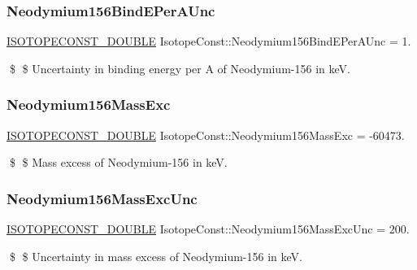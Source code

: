 \subsubsection{\texorpdfstring{Neodymium156\+Bind\+E\+Per\+A\+Unc}{Neodymium156BindEPerAUnc}}
{\footnotesize\ttfamily \mbox{\hyperlink{group___isotope_const-_macros_ga8f45a7272ce02c0b4c65c44636ed719a}{I\+S\+O\+T\+O\+P\+E\+C\+O\+N\+S\+T\+\_\+\+D\+O\+U\+B\+LE}} Isotope\+Const\+::\+Neodymium156\+Bind\+E\+Per\+A\+Unc = 1.}

\$ \$ Uncertainty in binding energy per A of Neodymium-\/156 in keV. \mbox{\label{group___isotope_const-_neodymium-_nd156_ga262cb58e1ba4e6573d21969db9212f2f}} 
\subsubsection{\texorpdfstring{Neodymium156\+Mass\+Exc}{Neodymium156MassExc}}
{\footnotesize\ttfamily \mbox{\hyperlink{group___isotope_const-_macros_ga8f45a7272ce02c0b4c65c44636ed719a}{I\+S\+O\+T\+O\+P\+E\+C\+O\+N\+S\+T\+\_\+\+D\+O\+U\+B\+LE}} Isotope\+Const\+::\+Neodymium156\+Mass\+Exc = -\/60473.}

\$ \$ Mass excess of Neodymium-\/156 in keV. \mbox{\label{group___isotope_const-_neodymium-_nd156_gaec2de5279ee342267ba7674ed91ed8c7}} 
\subsubsection{\texorpdfstring{Neodymium156\+Mass\+Exc\+Unc}{Neodymium156MassExcUnc}}
{\footnotesize\ttfamily \mbox{\hyperlink{group___isotope_const-_macros_ga8f45a7272ce02c0b4c65c44636ed719a}{I\+S\+O\+T\+O\+P\+E\+C\+O\+N\+S\+T\+\_\+\+D\+O\+U\+B\+LE}} Isotope\+Const\+::\+Neodymium156\+Mass\+Exc\+Unc = 200.}

\$ \$ Uncertainty in mass excess of Neodymium-\/156 in keV. \mbox{\label{group___isotope_const-_neodymium-_nd156_gaa08e165997c514ef4403a74dc86b999c}} 
